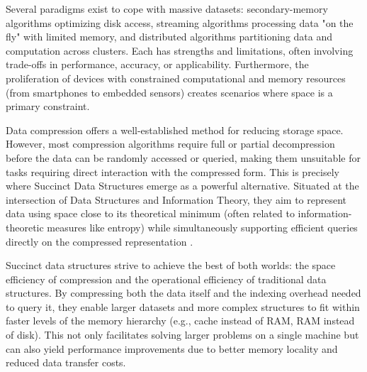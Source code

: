 Several paradigms exist to cope with massive datasets: secondary-memory algorithms optimizing disk access, streaming algorithms processing data "on the fly" with limited memory, and distributed algorithms partitioning data and computation across clusters. Each has strengths and limitations, often involving trade-offs in performance, accuracy, or applicability. Furthermore, the proliferation of devices with constrained computational and memory resources (from smartphones to embedded sensors) creates scenarios where space is a primary constraint.

Data compression offers a well-established method for reducing storage space. However, most compression algorithms require full or partial decompression before the data can be randomly accessed or queried, making them unsuitable for tasks requiring direct interaction with the compressed form. This is precisely where Succinct Data Structures emerge as a powerful alternative. Situated at the intersection of Data Structures and Information Theory, they aim to represent data using space close to its theoretical minimum (often related to information-theoretic measures like entropy) while simultaneously supporting efficient queries directly on the compressed representation \cite{navarro2016compact}.

Succinct data structures strive to achieve the best of both worlds: the space efficiency of compression and the operational efficiency of traditional data structures. By compressing both the data itself and the indexing overhead needed to query it, they enable larger datasets and more complex structures to fit within faster levels of the memory hierarchy (e.g., cache instead of RAM, RAM instead of disk). This not only facilitates solving larger problems on a single machine but can also yield performance improvements due to better memory locality and reduced data transfer costs.


